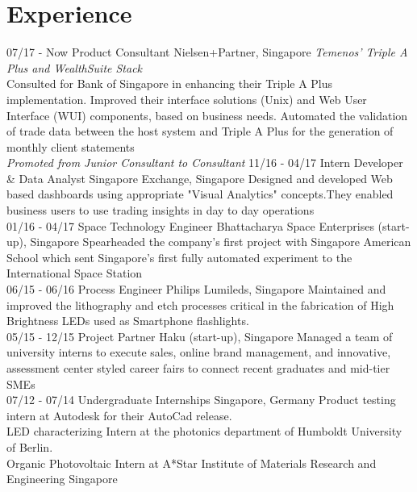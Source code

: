 \documentclass[]{friggeri-cv}
\begin{document}
\section{Experience}
\begin{entrylist}
  \entry
    {07/17 - Now}
    {Product Consultant}
    {Nielsen+Partner, Singapore}
    {\emph{Temenos' Triple A Plus and WealthSuite Stack}\\
    Consulted for Bank of Singapore in enhancing their Triple A Plus implementation. Improved their interface solutions (Unix) and Web User Interface (WUI) components, based on business needs. Automated the validation of trade data between the host system and Triple A Plus for the generation of monthly client statements\\\emph{Promoted from Junior Consultant to Consultant}}
  \entry
    {11/16 - 04/17}
    {Intern Developer \& Data Analyst}
    {Singapore Exchange, Singapore}
    {Designed and developed Web based dashboards using appropriate "Visual Analytics" concepts.They enabled business users to use trading insights in day to day operations\\}
    \entry
    {01/16 - 04/17}
    {Space Technology Engineer}
    {Bhattacharya Space Enterprises (start-up), Singapore}
    {Spearheaded the company's first project with Singapore American School which sent Singapore's first fully automated experiment to the International Space Station\\}
    \entry
    {06/15 - 06/16}
    {Process Engineer}
    {Philips Lumileds, Singapore}
    {Maintained and improved the lithography and etch processes critical in the fabrication of High Brightness LEDs used as Smartphone flashlights.\\}
    \entry
    {05/15 - 12/15}
    {Project Partner}
    {Haku (start-up), Singapore}
    {Managed a team of university interns to execute sales, online brand management, and innovative, assessment center styled career fairs to connect recent graduates and mid-tier SMEs\\}
    \entry
    {07/12 - 07/14}
    {Undergraduate Internships}
    {Singapore, Germany}
    {Product testing intern at Autodesk for their AutoCad release.\\
    LED characterizing Intern at the photonics department of Humboldt University of Berlin.\\
    Organic Photovoltaic Intern at A*Star Institute of Materials Research and Engineering Singapore}
\end{entrylist}
\end{document}
